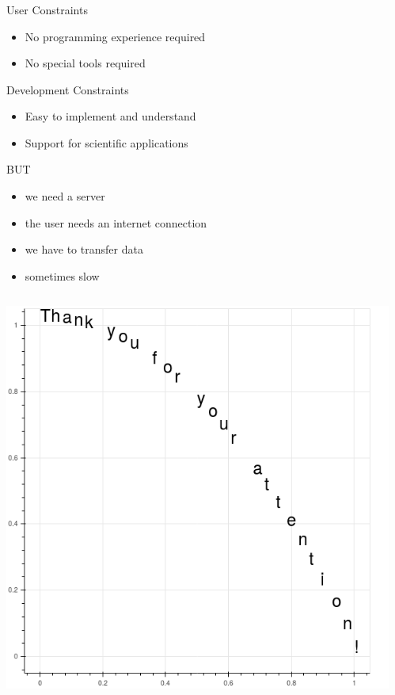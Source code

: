 \documentclass[11pt]{beamer}
\newcommand{\cmark}{\ding{51}}%
\newcommand{\citem}{\item[\textcolor{olive}{\cmark}]}
\begin{document}
\begin{frame}
\frametitle{\insertsubsection}
\begin{block}{User Constraints}
\begin{itemize}
\citem No programming experience required
\citem No special tools required
\end{itemize}
\end{block}

\begin{block}{Development Constraints}
\begin{itemize}
\citem Easy to implement and understand
\citem Support for scientific applications
\end{itemize}
\end{block}

\begin{block}{BUT}
\begin{itemize}
\item we need a server
\item the user needs an internet connection
\item we have to transfer data
\item sometimes slow
\end{itemize}
\end{block}
\end{frame}

\begin{frame}
\begin{columns}
\begin{column}{.5\textwidth}
\includegraphics[width=\textwidth]{Pictures/thanks.png}
\end{column}
\begin{column}{.5\textwidth}

\end{column}
\end{columns}

\end{frame}
\end{document}
